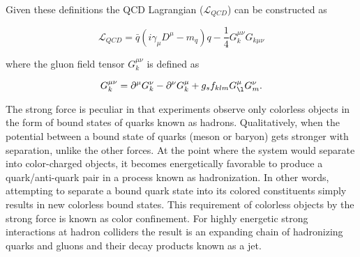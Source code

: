 Given these definitions the QCD Lagrangian ($\mathcal{L}_{QCD}$) can be
constructed as 

\begin{equation} \label{eq:qcd:qcd_lagrangian}
\mathcal{L}_{QCD} = \bar{q}(i\gamma_{\mu}D^{\mu} - m_{q})q -
\frac{1}{4}G_{k}^{\mu\nu}G_{k\mu\nu}
\end{equation}

where the gluon field tensor $G_{k}^{\mu\nu}$ is defined as

\begin{equation} \label{eq:qcd:gluon_tensor}
G_{k}^{\mu\nu} = \partial^{\mu}G_{k}^{\nu} - \partial^{\nu}G_{k}^{\mu} +
g_{s}f_{klm}G_{\l}^{\mu}G_{m}^{\nu}.
\end{equation}

The strong force is peculiar in that experiments observe only colorless
objects in the form of bound states of quarks known as hadrons.  Qualitatively,
when the potential between a bound state of quarks (meson or baryon) gets
stronger with separation, unlike the other forces.  At the point where the
system would separate into color-charged objects, it becomes energetically
favorable to produce a quark/anti-quark pair in a process known as
hadronization.  In other words, attempting to separate a bound quark state into
its colored constituents simply results in new colorless bound states.  This
requirement of colorless objects by the strong force is known as color
confinement. For highly energetic strong interactions at hadron colliders the
result is an expanding chain of hadronizing quarks and gluons and their decay
products known as a jet.


